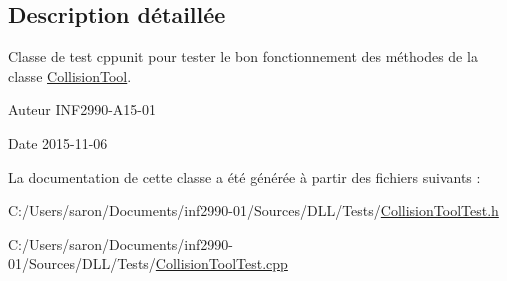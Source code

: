 \subsection{Description détaillée}
Classe de test cppunit pour tester le bon fonctionnement des méthodes de la classe \hyperlink{class_collision_tool}{Collision\-Tool}. 

\begin{DoxyAuthor}{Auteur}
I\-N\-F2990-\/\-A15-\/01 
\end{DoxyAuthor}
\begin{DoxyDate}{Date}
2015-\/11-\/06 
\end{DoxyDate}


La documentation de cette classe a été générée à partir des fichiers suivants \-:\begin{DoxyCompactItemize}
\item 
C\-:/\-Users/saron/\-Documents/inf2990-\/01/\-Sources/\-D\-L\-L/\-Tests/\hyperlink{_collision_tool_test_8h}{Collision\-Tool\-Test.\-h}\item 
C\-:/\-Users/saron/\-Documents/inf2990-\/01/\-Sources/\-D\-L\-L/\-Tests/\hyperlink{_collision_tool_test_8cpp}{Collision\-Tool\-Test.\-cpp}\end{DoxyCompactItemize}
